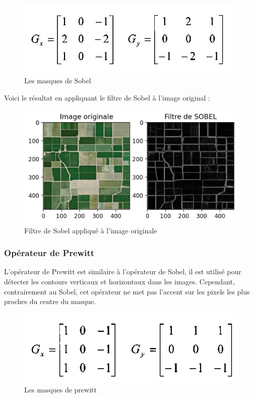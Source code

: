 \documentclass[12pt, openany]{report}
\begin{document}
\begin{figure}[H]
\centering
\includegraphics[scale=0.9]{sobel_masque.jpg}
\caption{Les masques de Sobel}
\end{figure}

Voici le résultat en appliquant le filtre de Sobel à l'image original :

\begin{figure}[H]
\centering
\includegraphics[scale=1.2]{sobel_result.png}
\caption{Filtre de Sobel appliqué à l'image originale}
\end{figure}


\subsubsection{Opérateur de Prewitt}
L'opérateur de Prewitt est similaire à l'opérateur de Sobel, il est utilisé pour détecter les contours verticaux et horizontaux dans les images. Cependant, contrairement au Sobel, cet opérateur ne met pas l'accent sur les pixels les plus proches du centre du masque.

\begin{figure}[H]
\centering
\includegraphics[scale=0.9]{prewit_masque.png}
\caption{Les masques de prewitt}
\end{figure}
\end{document}
